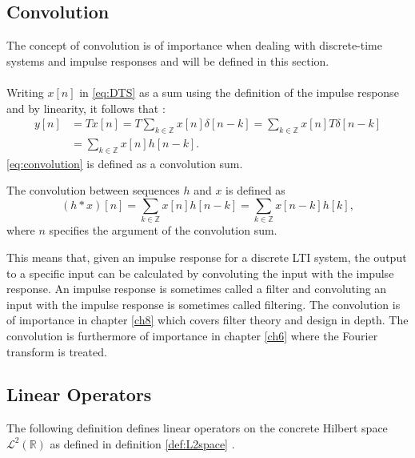 \subsection{Convolution}\label{sec:convol}
The concept of convolution is of importance when dealing with discrete-time systems and impulse responses and will be defined in this section.\\\\
Writing $x[n]$ in \eqref{eq:DTS} as a sum using the definition of the impulse response and by linearity, it follows that :
\begin{align}
y[n]&=Tx[n]=T\sum_{k\in\mathbb{Z}}x[n]\delta[n-k]
=\sum_{k\in\mathbb{Z}}x[n]T\delta[n-k]\nonumber\\
&=\sum_{k\in\mathbb{Z}}x[n]h[n-k].\label{eq:convolution}
\end{align}
\eqref{eq:convolution} is defined as a convolution sum.
\begin{definition}\label{def:convolution}
The convolution between sequences $h$ and $x$ is defined as
\begin{equation}
(h*x)[n]=\sum_{k\in\mathbb{Z}}x[n]h[n-k]=\sum_{k\in\mathbb{Z}}x[n-k]h[k],
\end{equation}
where $n$ specifies the argument of the convolution sum.
\end{definition}
This means that, given an impulse response for a discrete LTI system, the output to a specific input can be calculated by convoluting the input with the impulse response. An impulse response is sometimes called a filter and convoluting an input with the impulse response is sometimes called filtering. The convolution is of importance in chapter \ref{ch8} which covers filter theory and design in depth. The convolution is furthermore of importance in chapter \ref{ch6} where the Fourier transform is treated.

\subsection{Linear Operators}
The following definition defines linear operators on the concrete Hilbert space $\mathcal{L}^2(\mathbb{R})$ as defined in definition \ref{def:L2space} \cite{page 120, FSE2010} .

